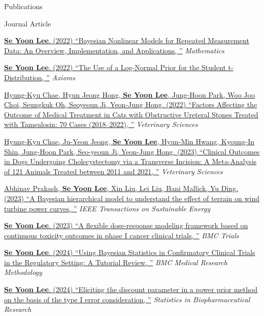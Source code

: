 \documentclass[
	11pt, %
]{resume} %
\begin{document}
\begin{rSection}{Publications}
\begin{rSubsection}{Journal Article}{}{}{}
\item[] [7]
\href{https://www.mdpi.com/2227-7390/10/6/898}
{\underline{\textbf{Se Yoon Lee}}. (2022)
``Bayesian Nonlinear Models for Repeated Measurement Data: An Overview, Implementation, and Applications, ''} \textit{Mathematics} 
\item[] [8]
\href{https://www.mdpi.com/2075-1680/11/9/462}
{\underline{\textbf{Se Yoon Lee}}. (2022)
``The Use of a Log-Normal Prior for the Student t-Distribution, ''} \textit{Axioms} 
\item[] [9]
\href{https://www.mdpi.com/2306-7381/9/10/568}
{Hyung-Kyu Chae, Hyun Jeong Hong, \underline{\textbf{Se Yoon Lee}}, Jung-Hoon Park, Woo Joo Choi, Seungkuk Oh, Seoyeoun Ji, Yeon-Jung Hong. (2022)
``Factors Affecting the Outcome of Medical Treatment in Cats with Obstructive Ureteral Stones Treated with Tamsulosin: 70 Cases (2018–2022), ''} \textit{Veterinary Sciences} 
\item[] [10]
\href{https://www.mdpi.com/2306-7381/10/6/395}
{Hyung-Kyu Chae, Ju-Yeon Jeong, \underline{\textbf{Se Yoon Lee}}, Hyun-Min Hwang, Kyoung-In Shin, Jung-Hoon Park, Seo-yeoun Ji, Yeon-Jung Hong. (2023)
``Clinical Outcomes in Dogs Undergoing Cholecystectomy via
a Transverse Incision: A Meta-Analysis of 121 Animals Treated
between 2011 and 2021, ''} \textit{Veterinary Sciences} 
\item[] [11]
\href{https://ieeexplore.ieee.org/document/10301539}
{Abhinav Prakash, \underline{\textbf{Se Yoon Lee}}, Xin Liu, Lei Liu,  Bani Mallick, Yu Ding. (2023)
``A Bayesian hierarchical model to understand the effect of terrain on wind turbine power curves, ''} \textit{IEEE Transactions on Sustainable Energy} 
\item[] [12]
\href{https://trialsjournal.biomedcentral.com/articles/10.1186/s13063-023-07793-0}
{\underline{\textbf{Se Yoon Lee}}. (2023)
``A flexible dose-response modeling framework based on continuous toxicity outcomes in phase I cancer clinical trials, ''} \textit{BMC Trials} 
\item[] [13]
\href{https://bmcmedresmethodol.biomedcentral.com/articles/10.1186/s12874-024-02235-0}
{\underline{\textbf{Se Yoon Lee}}. (2024)
	``Using Bayesian Statistics in Confirmatory Clinical Trials in the Regulatory Setting: A Tutorial Review, ''} \textit{BMC Medical Research Methodology} 
\item[] [14]
\href{https://www.tandfonline.com/doi/full/10.1080/19466315.2024.2368789?src=exp-la}{\underline{\textbf{Se Yoon Lee}}. (2024)
``Eliciting the discount parameter in a power prior method on the basis of the type I error	consideration, ''} \textit{Statistics in Biopharmaceutical Research}
\end{rSubsection}


\end{rSection}
\end{document}
